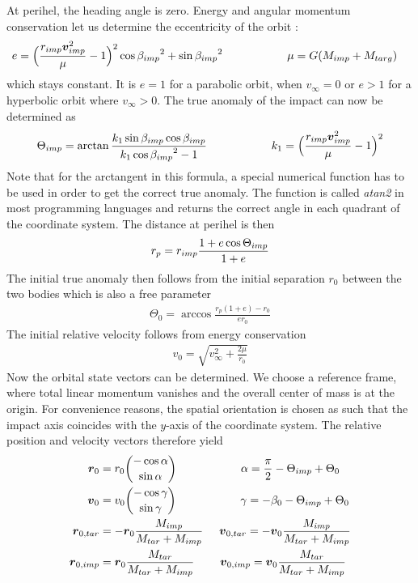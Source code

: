 At perihel, the heading angle is zero. Energy and angular momentum conservation let us determine the eccentricity of the orbit \citep{thomson1986introduction}:
\begin{align}
\label{ch02_aux_eq005}
e &= \Big( \frac{r_{imp} \boldsymbol{v}_{imp}^2}{\mu} - 1 \Big)^2 \cos{\beta_{imp}}^2 + \sin{\beta_{imp}}^2 \hspace{2.0cm} \mu = G ( M_{imp} + M_{targ} ) 
\end{align}
which stays constant. It is $e = 1$ for a parabolic orbit, when $v_{\infty} = 0$ or $e > 1$ for a hyperbolic orbit where $v_{\infty} > 0$. The true anomaly of the impact can now be determined as
\begin{align}
\label{ch02_aux_eq006}
\Theta_{imp} = \arctan{\frac{k_1 \sin{\beta_{imp}} \cos{\beta_{imp} }}{k_1 \cos{\beta_{imp}}^2 - 1} } \hspace{2.0cm} k_1 = \Big( \frac{r_{imp} \boldsymbol{v}_{imp}^2}{\mu} - 1 \Big)^2
\end{align}
Note that for the arctangent in this formula, a special numerical function has to be used in order to get the correct true anomaly. The function is called \emph{atan2} in most programming languages and returns the correct angle in each quadrant of the coordinate system. The distance at perihel is then
\begin{align}
\label{ch02_aux_eq007}
r_{p} = r_{imp} \frac{1 + e \cos{\Theta_{imp}} }{1 + e}
\end{align}
The initial true anomaly then follows from the initial separation $r_0$ between the two bodies which is also a free parameter
\begin{align}
\label{ch02_aux_eq008}
\Theta_0 = \arccos{\frac{r_p(1 + e) - r_0}{e r_0}}
\end{align}
The initial relative velocity follows from energy conservation
\begin{align}
\label{ch02_aux_eq009}
v_0 = \sqrt{v_{\infty}^2 + \frac{2 \mu}{r_0} }
\end{align}
Now the orbital state vectors can be determined.  We choose a reference frame, where total linear momentum vanishes and the overall center of mass is at the origin. For convenience reasons, the spatial orientation is chosen as such that the impact axis coincides with the $y$-axis of the coordinate system. The relative position and velocity vectors therefore yield 
\begin{align}
\label{ch02_aux_eq010}
\boldsymbol{r}_0 &= r_0 {- \cos{\alpha} \choose \sin{\alpha}} \hspace{2.0cm} \alpha = \frac{\pi}{2} - \Theta_{imp} + \Theta_0\\\
\boldsymbol{v}_0 &= v_0 {- \cos{\gamma} \choose \sin{\gamma}} \hspace{2.0cm} \gamma = - \beta_0 - \Theta_{imp} + \Theta_0\\
\boldsymbol{r}_{0,tar} &= - \boldsymbol{r}_0 \frac{M_{imp}}{M_{tar} + M_{imp}} \hspace{0.5cm}
\boldsymbol{v}_{0,tar} = - \boldsymbol{v}_0 \frac{M_{imp}}{M_{tar} + M_{imp}} \\
\boldsymbol{r}_{0,imp} &= \boldsymbol{r}_0 \frac{M_{tar}}{M_{tar} + M_{imp}} \hspace{0.8cm}
\boldsymbol{v}_{0,imp} = \boldsymbol{v}_0 \frac{M_{tar}}{M_{tar} + M_{imp}} \\
\end{align}
